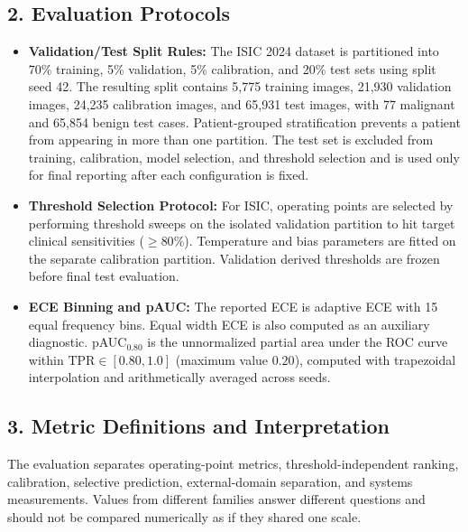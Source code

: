 \documentclass[letterpaper]{article}
\begin{document}
\subsection*{2. Evaluation Protocols}
\begin{itemize}
    \item \textbf{Validation/Test Split Rules:} The ISIC 2024 dataset is partitioned into 70\% training, 5\% validation, 5\% calibration, and 20\% test sets using split seed 42. The resulting split contains 5,775 training images, 21,930 validation images, 24,235 calibration images, and 65,931 test images, with 77 malignant and 65,854 benign test cases. Patient-grouped stratification prevents a patient from appearing in more than one partition. The test set is excluded from training, calibration, model selection, and threshold selection and is used only for final reporting after each configuration is fixed.
    \item \textbf{Threshold Selection Protocol:} For ISIC, operating points are selected by performing threshold sweeps on the isolated validation partition to hit target clinical sensitivities ($\ge 80\%$). Temperature and bias parameters are fitted on the separate calibration partition. Validation derived thresholds are frozen before final test evaluation.
    \item \textbf{ECE Binning and pAUC:} The reported ECE is adaptive ECE with 15 equal frequency bins. Equal width ECE is also computed as an auxiliary diagnostic. pAUC$_{0.80}$ is the unnormalized partial area under the ROC curve within $\text{TPR} \in [0.80, 1.0]$ (maximum value $0.20$), computed with trapezoidal interpolation and arithmetically averaged across seeds.
\end{itemize}

\subsection*{3. Metric Definitions and Interpretation}\label{app:metrics}
The evaluation separates operating-point metrics, threshold-independent ranking,
calibration, selective prediction, external-domain separation, and systems
measurements. Values from different families answer different questions and
should not be compared numerically as if they shared one scale.
\end{document}
